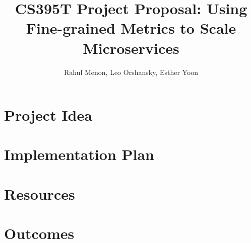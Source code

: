 \documentclass{proposal}
\begin{document}


\title{CS395T Project Proposal: Using Fine-grained Metrics to Scale Microservices
}

\author{Rahul Menon, Leo Orshansky, Esther Yoon}

\maketitle

\begin{abstract}
\end{abstract}

\section{Project Idea}

\section{Implementation Plan}

\section{Resources}

\section{Outcomes}

 
\begin{small}

\end{small}
\end{document}
